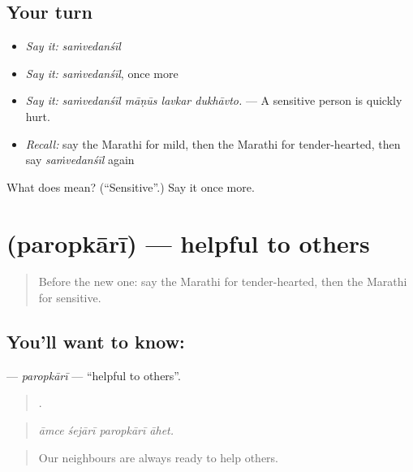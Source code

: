 \subsection*{Your turn}
\begin{itemize}
\raggedright
  \item \emph{Say it:} \emph{saṁvedanśīl}
  \item \emph{Say it:} \emph{saṁvedanśīl}, once more
  \item \emph{Say it:} \emph{saṁvedanśīl māṇūs lavkar dukhāvto.} — A sensitive person is quickly hurt.
  \item \emph{Recall:} say the Marathi for mild, then the Marathi for tender-hearted, then say \emph{saṁvedanśīl} again
\end{itemize}

\begin{tcolorbox}[breakable,colback=teal!4,colframe=teal!35!black,title={Before you move on}]
What does  mean? (\textquotedblleft{}Sensitive\textquotedblright{}.) Say it once more.
\end{tcolorbox}
\section[\texorpdfstring{\mr{परोपकारी} (paropkārī)}{परोपकारी (paropkārī)}]{ (paropkārī) — helpful to others}

\label{lesson:MR-C468-paropkari}



\begin{quote}
Before the new one: say the Marathi for tender-hearted, then the Marathi for sensitive.
\end{quote}

\subsection*{You'll want to know: }
\textbf{} — \emph{paropkārī} — \textquotedblleft{}helpful to others\textquotedblright{}.

\begin{quote}
   .
\end{quote}

\begin{quote}
\emph{āmce śejārī paropkārī āhet.}
\end{quote}

\begin{quote}
Our neighbours are always ready to help others.
\end{quote}

